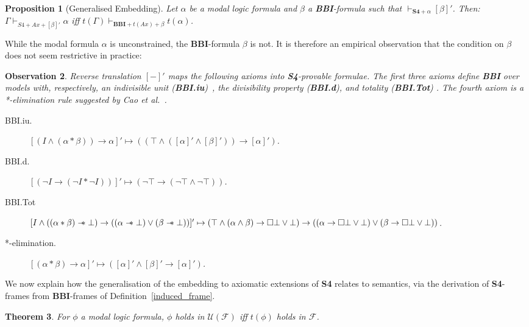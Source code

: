 \documentclass[a4paper]{article}
\newtheorem{theorem}{Theorem}[section]
\newtheorem{proposition}[theorem]{Proposition}
\newtheorem{observation}[theorem]{Observation}
\newcommand\magicwand{\mathrel{-\mkern-6mu*}}
\newcommand{\BBI}{\textbf{BBI}\xspace}
\newcommand{\SFour}{\textbf{S4}\xspace}
\newcommand{\rev}[1]{[#1]'}
\begin{document}
\begin{proposition}[Generalised Embedding] Let $\alpha$ be a modal logic formula and $\beta$ a \BBI-formula such that $\vdash_{\SFour + \alpha}[\beta]'$. Then: $\Gamma\vdash_{S4+Ax+[\beta]'} \alpha$ iff $t(\Gamma)\vdash_{\BBI+t(Ax)+\beta} t(\alpha)$.     
\end{proposition}

While the modal formula $\alpha$ is unconstrained, the \BBI-formula $\beta$ is not.
It is therefore an empirical observation that the condition on $\beta$ does not seem restrictive in practice:

\begin{observation} Reverse translation $\rev{-}$ maps the following axioms into \SFour-provable formulae. The first three axioms define \BBI over models with, respectively, an indivisible unit (\textbf{BBI.iu})~\cite{separation_theories}, the divisibility property (\textbf{BBI.d}), and totality (\textbf{BBI.Tot}) \cite{total_monoid_signature}.
The fourth axiom is a *-elimination rule suggested by Cao et al.~\cite{Bringing_order}.

\begin{description}
    \item[BBI.iu.] $[(I \land (\alpha * \beta))\rightarrow \alpha]'\mapsto((\top \land ([\alpha]' \land [\beta]'))\rightarrow [\alpha]')$.
    \item[BBI.d.] $[(\neg I \rightarrow (\neg I * \neg I))]'\mapsto (\neg \top \rightarrow (\neg \top \land \neg \top))$.
     \item[BBI.Tot] $[I\land((\alpha*\beta)\magicwand \bot) \rightarrow ((\alpha \magicwand \bot)\lor (\beta \magicwand \bot))]'\mapsto (\top \land (\alpha \land \beta)\rightarrow \Box \bot \lor \bot) \rightarrow ((\alpha \rightarrow \Box \bot \lor \bot)\lor (\beta \rightarrow \Box \bot \lor \bot))$.
     \item[*-elimination.] $[(\alpha * \beta) \rightarrow \alpha]'\mapsto ([\alpha]' \land
    [\beta]' \rightarrow [\alpha]')$.

\end{description}

    
\end{observation}
    
We now explain how the generalisation of the embedding to axiomatic extensions of \SFour relates to semantics, via the derivation of \SFour-frames from \BBI-frames of Definition~\ref{induced_frame}.

\begin{theorem}
For $\phi$ a modal logic formula, $\phi$ holds in $\mathcal{U}(\mathcal{F})$ iff $t(\phi)$ holds in $\mathcal{F}$.  
\label{theor:induced_frames}
\end{theorem}
\end{document}
